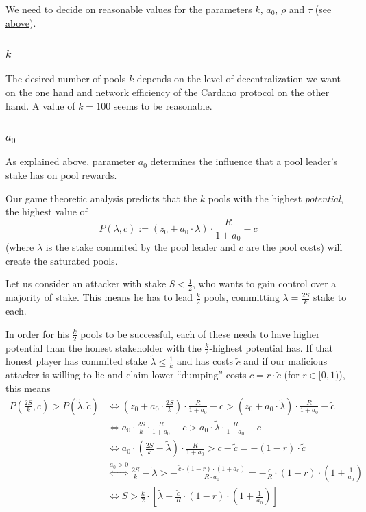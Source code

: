 \documentclass[11pt,a4paper]{article}
\begin{document}
We need to decide on reasonable values for the parameters \(k\),
\(a_0\), \(\rho\) and \(\tau\) (see \hyperref[parameters]{above}).

\subsubsection{\texorpdfstring{\(k\)}{k}}

The desired number of pools \(k\) depends on the level of
decentralization we want on the one hand and network efficiency of the
Cardano protocol on the other hand. A value of \(k=100\) seems to be
reasonable.

\subsubsection{\texorpdfstring{\(a_0\)}{a\_0}}

As explained above, parameter \(a_0\) determines the influence that a
pool leader's stake has on pool rewards.

Our game theoretic analysis predicts that the \(k\) pools with the
highest \emph{potential}, the highest value of \[
    P(\lambda,c):=\left(z_0+a_0\cdot\lambda\right)\cdot\frac{R}{1+a_0}-c
\] (where \(\lambda\) is the stake commited by the pool leader and \(c\)
are the pool costs) will create the saturated pools.

Let us consider an attacker with stake \(S < \frac{1}{2}\), who wants to
gain control over a majority of stake. This means he has to lead
\(\frac{k}{2}\) pools, committing \(\lambda=\frac{2S}{k}\) stake to
each.

In order for his \(\frac{k}{2}\) pools to be successful, each of these
needs to have higher potential than the honest stakeholder with the
\(\frac{k}{2}\)-highest potential has. If that honest player has
commited stake \(\tilde{\lambda}\leq\frac{1}{k}\) and has costs
\(\tilde{c}\) and if our malicious attacker is willing to lie and claim
lower ``dumping'' costs \(c=r\cdot\tilde{c}\) (for \(r\in[0,1)\)), this
means \[
\begin{split}
    P\left(\frac{2S}{k}, c\right) > P(\tilde{\lambda}, \tilde{c})
    &\Longleftrightarrow
    \left(z_0+a_0\cdot\frac{2S}{k}\right)\cdot\frac{R}{1+a_0}-c > \left(z_0+a_0\cdot\tilde{\lambda}\right)\cdot\frac{R}{1+a_0}-\tilde{c} \\
    &\Longleftrightarrow
    a_0\cdot\frac{2S}{k}\cdot\frac{R}{1+a_0}-c > a_0\cdot\tilde{\lambda}\cdot\frac{R}{1+a_0}-\tilde{c} \\
    &\Longleftrightarrow
    a_0\cdot\left(\frac{2S}{k}-\tilde{\lambda}\right)\cdot\frac{R}{1+a_0} > c-\tilde{c}=-(1-r)\cdot\tilde{c} \\
    &\stackrel{a_0>0}{\Longleftrightarrow}
    \frac{2S}{k}-\tilde{\lambda} > -\frac{\tilde{c}\cdot(1-r)\cdot(1+a_0)}{R\cdot a_0} =
    -\frac{\tilde{c}}{R}\cdot(1-r)\cdot\left(1 + \frac{1}{a_0}\right) \\
    &\Longleftrightarrow
    S > \frac{k}{2}\cdot\left[\tilde{\lambda}-\frac{\tilde{c}}{R}\cdot(1-r)\cdot\left(1+\frac{1}{a_0}\right)\right] \\
\end{split}
\]
\end{document}
